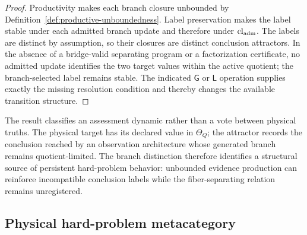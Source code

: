 \documentclass[11pt]{article}
\newcommand{\GOp}{\ensuremath{\mathsf{G}}}
\newcommand{\LOp}{\ensuremath{\mathsf{L}}}
\theoremstyle{definition}
\begin{document}
\begin{proof}
Productivity makes each branch closure unbounded by
Definition~\ref{def:productive-unboundedness}. Label preservation makes the label
stable under each admitted branch update and therefore under
$\operatorname{cl}_{\rm adm}$. The labels are distinct by assumption, so their
closures are distinct conclusion attractors. In the absence of a bridge-valid
separating program or a factorization certificate, no admitted update identifies
the two target values within the active quotient; the branch-selected label remains
stable. The indicated $\GOp$ or $\LOp$ operation supplies exactly the missing
resolution condition and thereby changes the available transition structure.
\end{proof}

The result classifies an assessment dynamic rather than a vote between physical
truths. The physical target has its declared value in $\Theta_Q$; the attractor
records the conclusion reached by an observation architecture whose generated
branch remains quotient-limited. The branch distinction therefore identifies a
structural source of persistent hard-problem behavior: unbounded evidence
production can reinforce incompatible conclusion labels while the
fiber-separating relation remains unregistered.

\subsection{Physical hard-problem metacategory}
\end{document}
